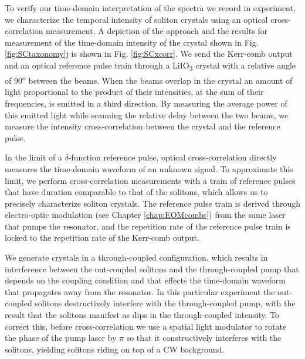 To verify our time-domain interpretation of the spectra we record in experiment, we characterize the temporal intensity of soliton crystals using an optical cross-correlation measurement. A depiction of the approach and the results for measurement of the time-domain intensity of the crystal shown in Fig. \ref{fig:SCtaxonomy}j is shown in Fig. \ref{fig:SCxcorr}. We send the Kerr-comb output and an optical reference pulse train through a LiIO\textsubscript{3} crystal with a relative angle of 90\textsuperscript{o} between the beams. When the beams overlap in the crystal an amount of light proportional to the product of their intensities, at the sum of their frequencies, is emitted in a third direction. By measuring the average power of this emitted light while scanning the relative delay between the two beams, we measure the intensity cross-correlation between the crystal and the reference pulse.

In the limit of a $\delta$-function reference pulse, optical cross-correlation directly measures the time-domain waveform of an unknown signal. To approximate this limit, we perform cross-correlation measurements with a train of reference pulses that have duration comparable to that of the solitons, which allows us to precisely characterize soliton crystals. The reference pulse train is derived through electro-optic modulation (see Chapter \ref{chap:EOMcombs}) from the same laser that pumps the resonator, and the repetition rate of the reference pulse train is locked to the repetition rate of the Kerr-comb output. 

We generate crystals in a through-coupled configuration, which results in interference between the out-coupled solitons and the through-coupled pump that depends on the coupling condition and that effects the time-domain waveform that propagates away from the resonator. In this particular experiment the out-coupled solitons destructively interfere with the through-coupled pump, with the result that the solitons manifest as dips in the through-coupled intensity. To correct this, before cross-correlation we use a spatial light modulator to rotate the phase of the pump laser by $\pi$ so that it constructively interferes with the solitons, yielding solitons riding on top of a CW background. 



